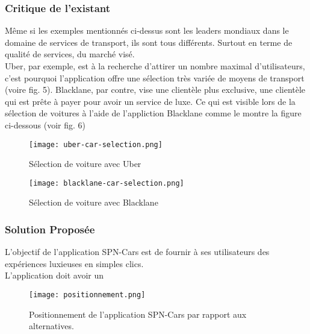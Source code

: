 \subsubsection{Critique de l'existant}
Même si les exemples mentionnés ci-dessus sont les leaders mondiaux dans le domaine de services de transport, ils sont tous différents. Surtout en terme de qualité de services, du marché visé.\\
\noindent Uber, par exemple, est à la recherche d'attirer un nombre maximal d'utilisateurs, c'est pourquoi l'application offre une sélection très variée de moyens de transport (voire fig. 5). Blacklane, par contre, vise une clientèle plus exclusive, une clientèle qui est prête à payer pour avoir un service de luxe. Ce qui est visible lors de la sélection de voitures à l'aide de l'appliction Blacklane comme le montre la figure ci-dessous (voir fig. 6)
\vspace{1cm}
\begin{multicols}{2}
    \begin{figure}[H]
        \centering
        \texttt{[image: uber-car-selection.png]}
        \vspace{1cm}
        \caption{Sélection de voiture avec Uber}
        \label{fig:uber_selection}
    \end{figure}
    \begin{figure}[H]
        \centering
        \texttt{[image: blacklane-car-selection.png]}
        \vspace{1cm}
        \caption{Sélection de voiture avec Blacklane}
        \label{fig:blacklane_selection}
    \end{figure}
\end{multicols}
\subsubsection{Solution Proposée}
L'objectif de l'application SPN-Cars est de fournir à ses utilisateurs des expériences luxieuses en simples clics.\\
L'application doit avoir un
\begin{figure}[H]
    \centering
    \texttt{[image: positionnement.png]}
    \vspace{1cm}
    \caption{Positionnement de l'application SPN-Cars par rapport aux alternatives.}
    \label{fig:positionnement_marcha}
\end{figure}
